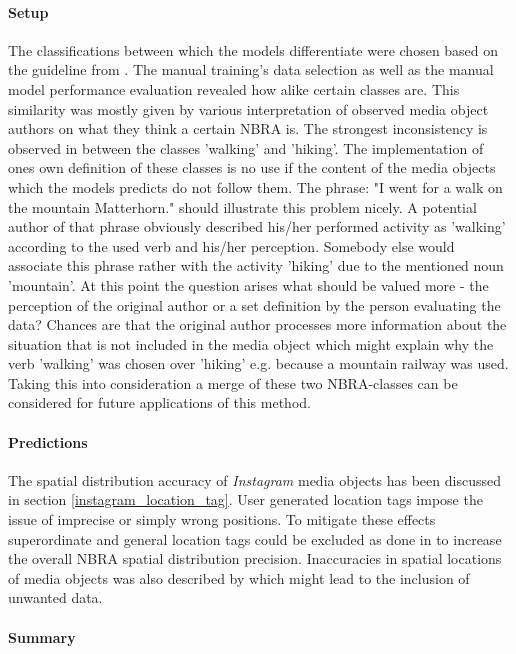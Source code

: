 \paragraph*{Setup} 
The classifications between which the models differentiate were chosen based on the guideline from \parencite{IFL2018}. The manual training's data selection as well as the manual model performance evaluation revealed how alike certain classes are. This similarity was mostly given by various interpretation of observed media object authors on what they think a certain NBRA is. The strongest inconsistency is observed in between the classes 'walking' and 'hiking'. The implementation of ones own definition of these classes is no use if the content of the media objects which the models predicts do not follow them. The phrase: "I went for a walk on the mountain Matterhorn." should illustrate this problem nicely. A potential author of that phrase obviously described his/her performed activity as 'walking' according to the used verb and his/her perception. Somebody else would associate this phrase rather with the activity 'hiking' due to the mentioned noun 'mountain'. At this point the question arises what should be valued more - the perception of the original author or a set definition by the person evaluating the data? Chances are that the original author processes more information about the situation that is not included in the media object which might explain why the verb 'walking' was chosen over 'hiking' e.g. because a mountain railway was used. 
Taking this into consideration a merge of these two NBRA-classes can be considered for future applications of this method.

\paragraph*{Predictions}
The spatial distribution accuracy of \textit{Instagram} media objects has been discussed in section \ref{instagram_location_tag}. User generated location tags impose the issue of imprecise or simply wrong positions. To mitigate these effects superordinate and general location tags could be excluded as done in \parencite{Heikinheimo2017} to increase the overall NBRA spatial distribution precision. Inaccuracies in spatial locations of media objects was also described by \parencite{Lee2016} which might lead to the inclusion of unwanted data.

\paragraph*{Summary}
